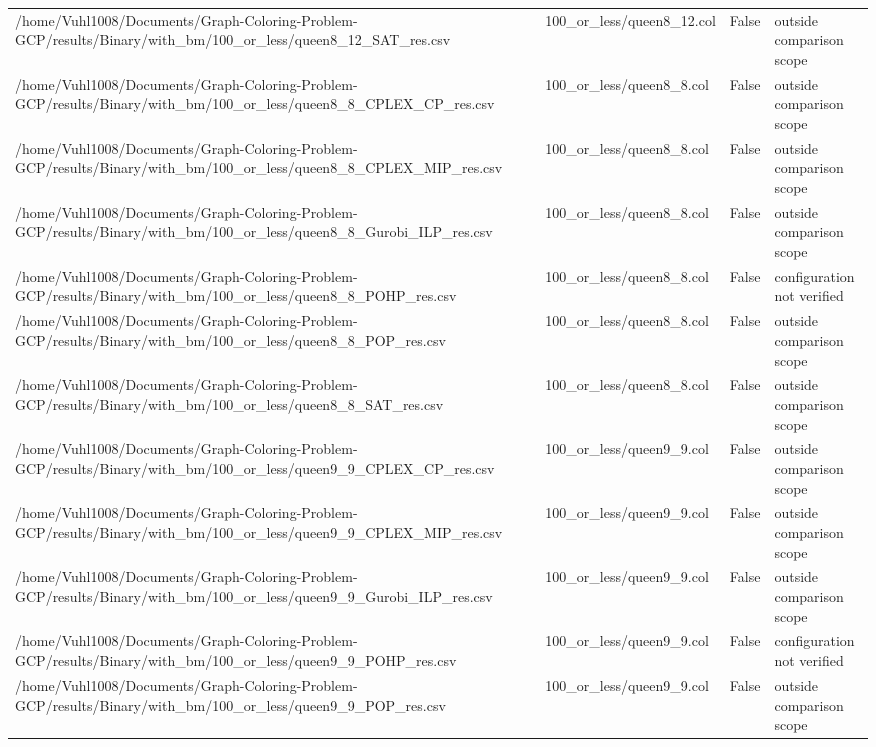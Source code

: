 \begin{table}[htbp]
\begin{tabular}{llll}
/home/Vuhl1008/Documents/Graph-Coloring-Problem-GCP/results/Binary/with\_bm/100\_or\_less/queen8\_12\_SAT\_res.csv & 100\_or\_less/queen8\_12.col & False & outside comparison scope \\
/home/Vuhl1008/Documents/Graph-Coloring-Problem-GCP/results/Binary/with\_bm/100\_or\_less/queen8\_8\_CPLEX\_CP\_res.csv & 100\_or\_less/queen8\_8.col & False & outside comparison scope \\
/home/Vuhl1008/Documents/Graph-Coloring-Problem-GCP/results/Binary/with\_bm/100\_or\_less/queen8\_8\_CPLEX\_MIP\_res.csv & 100\_or\_less/queen8\_8.col & False & outside comparison scope \\
/home/Vuhl1008/Documents/Graph-Coloring-Problem-GCP/results/Binary/with\_bm/100\_or\_less/queen8\_8\_Gurobi\_ILP\_res.csv & 100\_or\_less/queen8\_8.col & False & outside comparison scope \\
/home/Vuhl1008/Documents/Graph-Coloring-Problem-GCP/results/Binary/with\_bm/100\_or\_less/queen8\_8\_POHP\_res.csv & 100\_or\_less/queen8\_8.col & False & configuration not verified \\
/home/Vuhl1008/Documents/Graph-Coloring-Problem-GCP/results/Binary/with\_bm/100\_or\_less/queen8\_8\_POP\_res.csv & 100\_or\_less/queen8\_8.col & False & outside comparison scope \\
/home/Vuhl1008/Documents/Graph-Coloring-Problem-GCP/results/Binary/with\_bm/100\_or\_less/queen8\_8\_SAT\_res.csv & 100\_or\_less/queen8\_8.col & False & outside comparison scope \\
/home/Vuhl1008/Documents/Graph-Coloring-Problem-GCP/results/Binary/with\_bm/100\_or\_less/queen9\_9\_CPLEX\_CP\_res.csv & 100\_or\_less/queen9\_9.col & False & outside comparison scope \\
/home/Vuhl1008/Documents/Graph-Coloring-Problem-GCP/results/Binary/with\_bm/100\_or\_less/queen9\_9\_CPLEX\_MIP\_res.csv & 100\_or\_less/queen9\_9.col & False & outside comparison scope \\
/home/Vuhl1008/Documents/Graph-Coloring-Problem-GCP/results/Binary/with\_bm/100\_or\_less/queen9\_9\_Gurobi\_ILP\_res.csv & 100\_or\_less/queen9\_9.col & False & outside comparison scope \\
/home/Vuhl1008/Documents/Graph-Coloring-Problem-GCP/results/Binary/with\_bm/100\_or\_less/queen9\_9\_POHP\_res.csv & 100\_or\_less/queen9\_9.col & False & configuration not verified \\
/home/Vuhl1008/Documents/Graph-Coloring-Problem-GCP/results/Binary/with\_bm/100\_or\_less/queen9\_9\_POP\_res.csv & 100\_or\_less/queen9\_9.col & False & outside comparison scope \\

\end{tabular}
\end{table}
